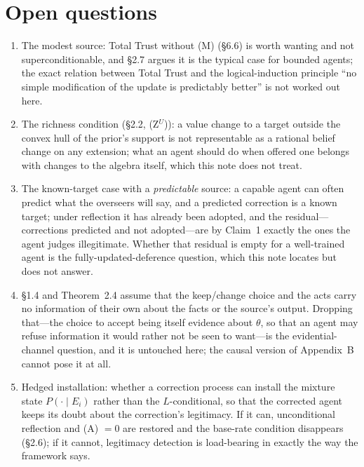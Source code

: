 \documentclass[11pt,a4paper]{article}
\begin{document}
\section{Open questions}
\begin{enumerate}[label=(\roman*),leftmargin=2.5em]
\item The modest source: Total Trust without (M) (\S6.6) is worth wanting and not superconditionable, and \S2.7 argues it is the typical case for bounded agents; the exact relation between Total Trust and the logical-induction principle ``no simple modification of the update is predictably better'' is not worked out here.
\item The richness condition (\S2.2, (Z$^U$)): a value change to a target outside the convex hull of the prior's support is not representable as a rational belief change on any extension; what an agent should do when offered one belongs with changes to the algebra itself, which this note does not treat.
\item The known-target case with a \emph{predictable} source: a capable agent can often predict what the overseers will say, and a predicted correction is a known target; under reflection it has already been adopted, and the residual---corrections predicted and not adopted---are by Claim~1 exactly the ones the agent judges illegitimate. Whether that residual is empty for a well-trained agent is the fully-updated-deference question, which this note locates but does not answer.
\item \S1.4 and Theorem~2.4 assume that the keep/change choice and the acts carry no information of their own about the facts or the source's output. Dropping that---the choice to accept being itself evidence about $\theta$, so that an agent may refuse information it would rather not be seen to want---is the evidential-channel question, and it is untouched here; the causal version of Appendix~B cannot pose it at all.
\item Hedged installation: whether a correction process can install the mixture state $P(\cdot \mid E_i)$ rather than the $L$-conditional, so that the corrected agent keeps its doubt about the correction's legitimacy. If it can, unconditional reflection and (A) $= 0$ are restored and the base-rate condition disappears (\S2.6); if it cannot, legitimacy detection is load-bearing in exactly the way the framework says.
\end{enumerate}

\appendix
\end{document}
